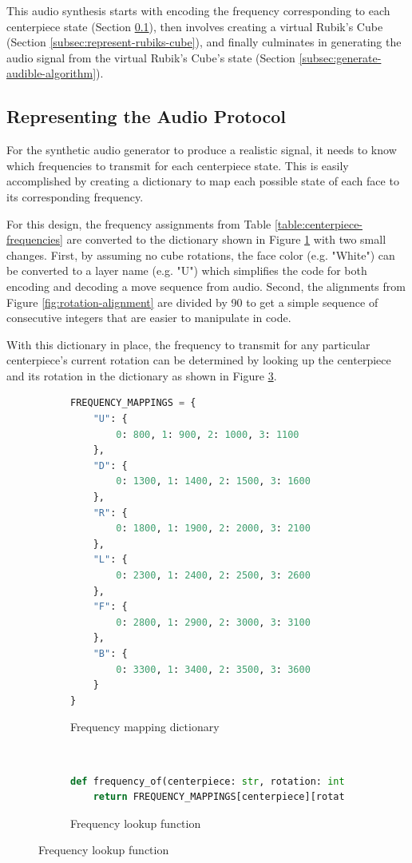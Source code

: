 This audio synthesis starts with encoding the frequency corresponding to each centerpiece state (Section \ref{subsec:represent-audio-protocol}), then involves creating a virtual Rubik's Cube (Section \ref{subsec:represent-rubiks-cube}), and finally culminates in generating the audio signal from the virtual Rubik's Cube's state (Section \ref{subsec:generate-audible-algorithm}).
\newpage
\subsection{Representing the Audio Protocol}
\label{subsec:represent-audio-protocol}
For the synthetic audio generator to produce a realistic signal, it needs to know which frequencies to transmit for each centerpiece state. 
This is easily accomplished by creating a dictionary to map each possible state of each face to its corresponding frequency.

For this design, the frequency assignments from Table \ref{table:centerpiece-frequencies} are converted to the dictionary shown in Figure \ref{fig:code-freq-mapping-dict} with two small changes.
First, by assuming no cube rotations, the face color (e.g. "White") can be converted to a layer name (e.g. "U") which simplifies the code for both encoding and decoding a move sequence from audio.
Second, the alignments from Figure \ref{fig:rotation-alignment} are divided by 90 to get a simple sequence of consecutive integers that are easier to manipulate in code.

With this dictionary in place, the frequency to transmit for any particular centerpiece's current rotation can be determined by looking up the centerpiece and its rotation in the dictionary as shown in Figure \ref{fig:code-frequency-of}.

\begin{figure}[h]
\caption{Centerpiece State to Frequency Mapping}
\begin{subfigure}{\textwidth}
\caption{Frequency mapping dictionary}
\label{fig:code-freq-mapping-dict}
\begin{lstlisting}[language=Python]
FREQUENCY_MAPPINGS = {
    "U": {
        0: 800, 1: 900, 2: 1000, 3: 1100
    },
    "D": {
        0: 1300, 1: 1400, 2: 1500, 3: 1600
    },
    "R": {
        0: 1800, 1: 1900, 2: 2000, 3: 2100
    },
    "L": {
        0: 2300, 1: 2400, 2: 2500, 3: 2600
    },
    "F": {
        0: 2800, 1: 2900, 2: 3000, 3: 3100
    },
    "B": {
        0: 3300, 1: 3400, 2: 3500, 3: 3600
    }
}
\end{lstlisting}
\end{subfigure}\\
\begin{subfigure}{\textwidth}
\caption{Frequency lookup function}
\label{fig:code-frequency-of}
\begin{lstlisting}[language=Python, firstnumber=last]
def frequency_of(centerpiece: str, rotation: int) -> float:
    return FREQUENCY_MAPPINGS[centerpiece][rotation]
\end{lstlisting}
\end{subfigure}
\end{figure}


